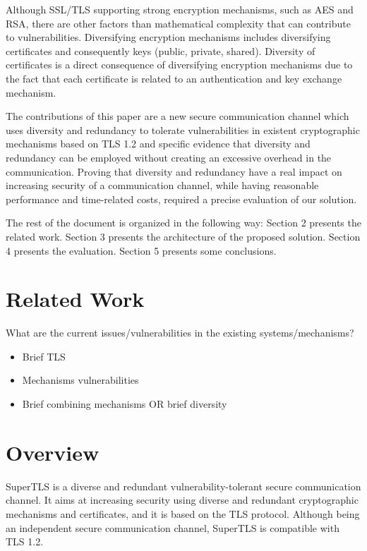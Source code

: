 \documentclass{sig-alternate-05-2015}
\begin{document}
Although SSL/TLS supporting strong encryption mechanisms, such as AES and RSA, there are other factors than mathematical complexity that can contribute to vulnerabilities.
Diversifying encryption mechanisms includes diversifying certificates and consequently keys (public, private, shared).
Diversity of certificates is a direct consequence of diversifying encryption mechanisms due to the fact that each certificate is related to an authentication and key exchange mechanism.

The contributions of this paper are a new secure communication channel which uses diversity and redundancy to tolerate vulnerabilities in existent cryptographic mechanisms based on TLS 1.2 and specific evidence that diversity and redundancy can be employed without creating an excessive overhead in the communication. Proving that diversity and redundancy have a real impact on increasing security of a communication channel, while having reasonable performance and time-related costs, required a precise evaluation of our solution.

The rest of the document is organized in the following way: Section 2 presents the related work. Section 3 presents the architecture of the proposed solution. Section 4 presents the evaluation. Section 5 presents some conclusions.

\section{Related Work}
\label{sec-related-work}

What are the current issues/vulnerabilities in the existing systems/mechanisms? 

\begin{itemize}
	\item{Brief TLS}
\end{itemize}

\begin{itemize}
	\item{Mechanisms vulnerabilities}
	\item{Brief combining mechanisms OR brief diversity}
\end{itemize}

\section{Overview}

SuperTLS is a diverse and redundant vulnerability-tolerant secure communication channel. It aims at increasing security using diverse and redundant cryptographic mechanisms and certificates, and it is based on the TLS protocol. Although being an independent secure communication channel, SuperTLS is compatible with TLS 1.2.
\end{document}
